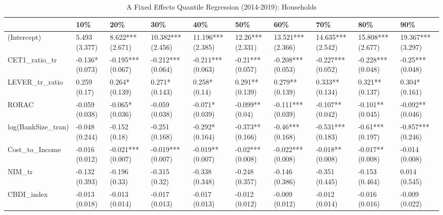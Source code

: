 \begin{table}[ht]
\centering
\caption{A Fixed Effects Quantile Regression (2014-2019): Households} 
\begingroup\small
\begin{tabular}{llllllllll}
  \toprule
 & 10\% & 20\% & 30\% & 40\% & 50\% & 60\% & 70\% & 80\% & 90\% \\ 
  \midrule
(Intercept) & 5.493 (3.377) & 8.622*** (2.671) & 10.382*** (2.456) & 11.196*** (2.385) & 12.26*** (2.331) & 13.521*** (2.366) & 14.635*** (2.542) & 15.808*** (2.677) & 19.367*** (3.297) \\ 
  CET1\_ratio\_tr & -0.136* (0.073) & -0.195*** (0.067) & -0.212*** (0.064) & -0.211*** (0.063) & -0.21*** (0.057) & -0.208*** (0.053) & -0.227*** (0.052) & -0.228*** (0.048) & -0.25*** (0.048) \\ 
  LEVER\_tr\_ratio & 0.259 (0.17) & 0.264* (0.139) & 0.271* (0.143) & 0.258* (0.14) & 0.291** (0.139) & 0.279** (0.139) & 0.333** (0.134) & 0.321** (0.137) & 0.304* (0.161) \\ 
  RORAC & -0.059 (0.038) & -0.065* (0.036) & -0.059 (0.038) & -0.071* (0.039) & -0.099** (0.04) & -0.111*** (0.039) & -0.107** (0.042) & -0.101** (0.045) & -0.092** (0.046) \\ 
  log(BankSize\_tran) & -0.048 (0.244) & -0.152 (0.18) & -0.251 (0.168) & -0.292* (0.164) & -0.373** (0.166) & -0.46*** (0.168) & -0.531*** (0.183) & -0.61*** (0.197) & -0.857*** (0.246) \\ 
  Cost\_to\_Income & -0.016 (0.012) & -0.021*** (0.007) & -0.019*** (0.007) & -0.019** (0.007) & -0.02*** (0.008) & -0.022*** (0.008) & -0.018** (0.008) & -0.017** (0.008) & -0.014 (0.008) \\ 
  NIM\_tr & -0.132 (0.393) & -0.196 (0.33) & -0.315 (0.32) & -0.338 (0.348) & -0.248 (0.357) & -0.146 (0.386) & -0.351 (0.445) & -0.153 (0.464) & 0.014 (0.545) \\ 
  CBDI\_index & -0.013 (0.018) & -0.013 (0.014) & -0.017 (0.013) & -0.017 (0.013) & -0.012 (0.012) & -0.009 (0.012) & -0.012 (0.014) & -0.016 (0.016) & -0.009 (0.022) \\ 
   \bottomrule
\end{tabular}
\endgroup
\end{table}
